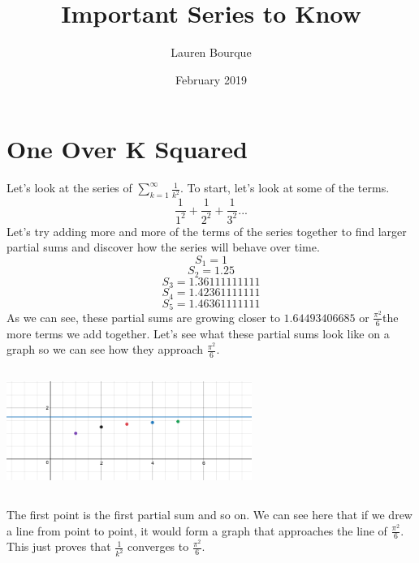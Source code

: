 \documentclass[a4paper,openright, 14pt]{article}
\title{Important Series to Know}
\author{Lauren Bourque}
\date{February 2019}
\begin{document}
\maketitle
\section*{One Over K Squared}
Let's look at the series of $\sum\limits_{k=1}^{\infty} \frac{1}{k^2}$. To start, let's look at some of the terms.
$$\frac{1}{1^2}+\frac{1}{2^2}+\frac{1}{3^2}...$$
Let's try adding more and more of the terms of the series together to find larger partial sums and discover how the series will behave over time.
$$S_1=1$$
$$S_2=1.25$$
$$S_3=1.36111111111$$
$$S_4=1.42361111111$$
$$S_5=1.46361111111$$
As we can see, these partial sums are growing closer to $1.64493406685$ or $\frac{\pi^2}{6}$the more terms we add together. Let's see what these partial sums look like on a graph so we can see how they approach $\frac{\pi^2}{6}$.
\begin{center}
    \includegraphics[height=4cm, width=8cm]{Images/graph.png}
\end{center}
The first point is the first partial sum and so on. We can see here that if we drew a line from point to point, it would form a graph that approaches the line of $\frac{\pi^2}{6}$. This just proves that $\frac{1}{k^2}$ converges to $\frac{\pi^2}{6}$.
\end{document}

